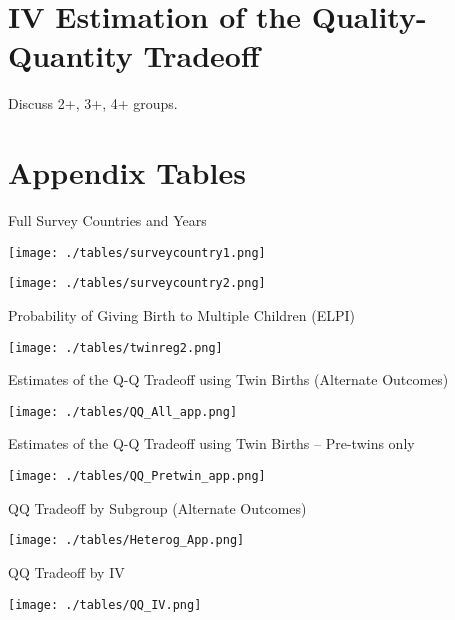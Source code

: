 \section{IV Estimation of the Quality-Quantity Tradeoff}
\label{scn:IV}
Discuss 2+, 3+, 4+ groups.

\section{Appendix Tables}
\label{scn:appendixtables}

\begin{table}[htpb!]
\caption{Full Survey Countries and Years}
\label{tab:countries}
\begin{center}
\texttt{[image: ./tables/surveycountry1.png]} 
\end{center}
\end{table}

\begin{center}
\texttt{[image: ./tables/surveycountry2.png]} 
\end{center}

\begin{table}[htpb!]
\caption{Probability of Giving Birth to Multiple Children (ELPI)}
\label{tab:twinreg2}
\begin{center}
\texttt{[image: ./tables/twinreg2.png]} 
\end{center}
\end{table}

\begin{table}[htpb!]
\caption{Estimates of the Q-Q Tradeoff using Twin Births (Alternate Outcomes)}
\label{tab:QQAllApp}
\begin{center}
\texttt{[image: ./tables/QQ\_All\_app.png]} 
\end{center}
\end{table}

\begin{table}[htpb!]
\caption{Estimates of the Q-Q Tradeoff using Twin Births -- Pre-twins only}
\label{tab:QQPretwinApp}
\begin{center}
\texttt{[image: ./tables/QQ\_Pretwin\_app.png]} 
\end{center}
\end{table}

\begin{table}[htpb!]
\caption{QQ Tradeoff by Subgroup (Alternate Outcomes)}
\label{tab:Heterog}
\begin{center}
\texttt{[image: ./tables/Heterog\_App.png]} 
\end{center}
\end{table}

\begin{landscape}
\begin{table}[htpb!]
\caption{QQ Tradeoff by IV}
\label{tab:Heterog}
\begin{center}
\texttt{[image: ./tables/QQ\_IV.png]} 
\end{center}
\end{table}
\end{landscape}


